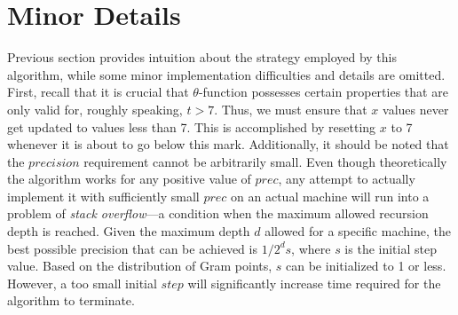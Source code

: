 \documentclass[a4paper]{article}
\begin{document}
\section{Minor Details}
Previous section provides intuition about the strategy employed by this algorithm, while some minor implementation difficulties and details are omitted. First, recall that it is crucial that $\theta$-function possesses certain properties that are only valid for, roughly speaking, $t>7$. Thus, we must ensure that $x$ values never get updated to values less than 7. This is accomplished by resetting $x$ to 7 whenever it is about to go below this mark. Additionally, it should be noted that the $precision$ requirement cannot be arbitrarily small. Even though theoretically the algorithm works for any positive value of $prec$, any attempt to actually implement it with sufficiently small $prec$ on an actual machine will run into a problem of \textit{stack overflow}---a condition when the maximum allowed recursion depth is reached. Given the maximum depth $d$ allowed for a specific machine, the best possible precision that can be achieved is $1/2^{d}s$, where $s$ is the initial step value. Based on the distribution of Gram points, $s$ can be initialized to 1 or less. However, a too small initial $step$ will significantly increase time required for the algorithm to terminate.
\end{document}
